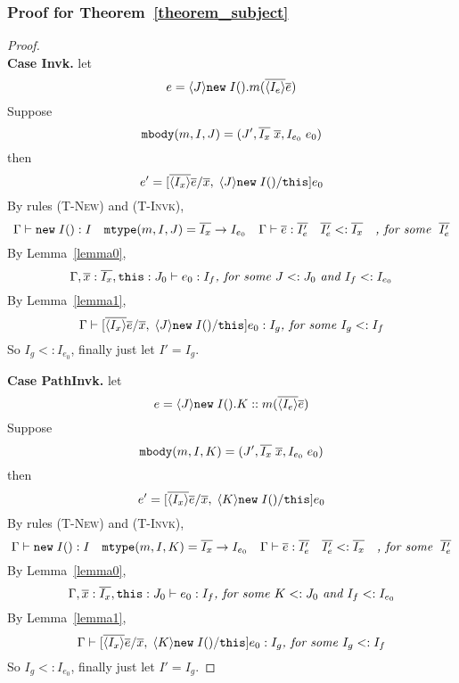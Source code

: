\subsubsection{Proof for Theorem~\ref{theorem_subject}}
\begin{proof} ~\\
\noindent \textbf{Case Invk.} 
let \[ e = \langle J \rangle\texttt{new} \; I().m(\overline{\langle I_e \rangle}\overline{e}) \] 
Suppose \[ \texttt{mbody}(m, I, J) = (J', \overline{I_x} \; \overline{x}, I_{e_0} \; e_0) \] 
then \[ e' =  [\overline{\langle I_x \rangle} \overline{e}/\overline{x}, \; \langle J \rangle\texttt{new} \; I()/\texttt{this} ] e_0 \] 
By rules \textsc{(T-New)} and \textsc{(T-Invk)}, 
  \[ \Gamma \; {\vdash} \; \texttt{new} \; I():I \quad 
     \texttt{mtype}(m, I, J) = \overline{I_x} \rightarrow I_{e_0} \quad 
     \Gamma \; {\vdash} \; \overline{e} : \overline{I_e'} \quad
     \overline{I_e'} <: \overline{I_x} \quad
     \textit{, for some } \; \overline{I_e'}
  \]
By Lemma~\ref{lemma0},
    \[
    \Gamma, \overline{x}:\overline{I_x}, \texttt{this}:J_0 \; {\vdash} \; e_0:I_f \textit{, for some } J <: J_0 \textit{ and } I_f <: I_{e_0}
    \]
By Lemma~\ref{lemma1},
    \[
    \Gamma \; {\vdash} \; [\overline{\langle I_x \rangle} \overline{e}/\overline{x}, \; \langle J \rangle\texttt{new} \; I()/\texttt{this} ] e_0  :  I_g \textit{, for some } I_g <: I_f 
    \]
So $I_g <: I_{e_0}$, finally just let $I' = I_g$.

\noindent \textbf{Case PathInvk.}
let \[ e = \langle J \rangle\texttt{new} \; I().K::m(\overline{\langle I_e \rangle} \overline{e}) \]  
Suppose \[ \texttt{mbody}(m, I, K) = (J', \overline{I_x} \; \overline{x}, I_{e_0} \; e_0) \] 
then \[ e' =  [\overline{\langle I_x \rangle} \overline{e}/\overline{x}, \; \langle K \rangle\texttt{new} \; I()/\texttt{this} ] e_0 \] 
By rules \textsc{(T-New)} and \textsc{(T-Invk)}, 
  \[ \Gamma \; {\vdash} \; \texttt{new} \; I():I \quad 
     \texttt{mtype}(m, I, K) = \overline{I_x} \rightarrow I_{e_0} \quad 
     \Gamma \; {\vdash} \; \overline{e} : \overline{I_e'} \quad
     \overline{I_e'} <: \overline{I_x} \quad
     \textit{, for some } \; \overline{I_e'}
  \]
By Lemma~\ref{lemma0},
    \[
    \Gamma, \overline{x}:\overline{I_x}, \texttt{this}:J_0 \; {\vdash} \; e_0:I_f \textit{, for some } K <: J_0 \textit{ and } I_f <: I_{e_0}
    \]
By Lemma~\ref{lemma1},
    \[
    \Gamma \; {\vdash} \; [\overline{\langle I_x \rangle} \overline{e}/\overline{x}, \; \langle K \rangle\texttt{new} \; I()/\texttt{this} ] e_0  :  I_g \textit{, for some } I_g <: I_f 
    \]
So $I_g <: I_{e_0}$, finally just let $I' = I_g$.


\end{proof}
